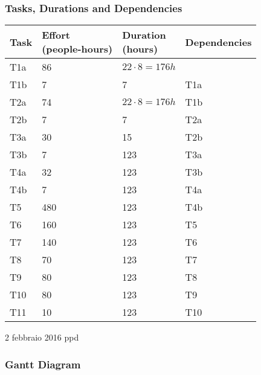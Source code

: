 \subsubsection{Tasks, Durations and Dependencies}
\lipsum[100]
\begin{center}
	\begin{tabulary}{\linewidth\tymin=70pt}{Y{2cm}|Y{3cm}|Y{2cm}|Y{2cm}}
		\textbf{Task} & \textbf{Effort\newline(people-hours)} & \textbf{Duration\newline(hours)} & \textbf{Dependencies} \\ \hline
		T1a &  86 & $22 \cdot 8 = 176h$  & \\ \hline
		T1b & 7 & 7 & T1a \\ \hline
		T2a & 74 & $22 \cdot 8 = 176h$ & T1b \\ \hline
		T2b & 7 & 7 & T2a \\ \hline
		T3a & 30 & 15 & T2b \\ \hline
		T3b & 7 & 123 & T3a \\ \hline
		T4a & 32 & 123 & T3b \\ \hline
		T4b & 7 & 123 & T4a \\ \hline
		T5 & 480 & 123 & T4b \\ \hline
		T6 & 160 & 123 & T5 \\ \hline
		T7 & 140 & 123 & T6 \\ \hline
		T8 & 70 & 123 & T7 \\ \hline
		T9 & 80 & 123 & T8 \\ \hline
		T10 & 80 & 123 & T9 \\ \hline
		T11 & 10 & 123 & T10 \\ \hline
	\end{tabulary}
	
	2 febbraio 2016 ppd
\end{center}
%
\subsubsection{Gantt Diagram}
\lipsum[100]
\begin{center}
	\begin{ganttchart}[hgrid=true,vgrid={draw=none, dotted}, x unit=4mm]{1}{24}
		 \\
		 \\
		 \\
		 \\
		 \\
	\end{ganttchart}
\end{center}
%